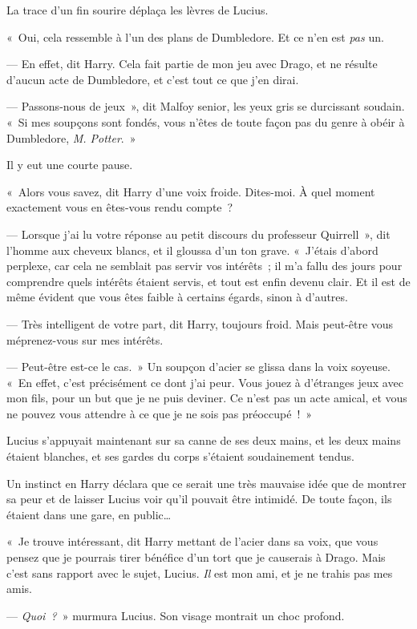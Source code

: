 La trace d'un fin sourire déplaça les lèvres de Lucius.

«~Oui, cela ressemble à l'un des plans de Dumbledore.
Et ce n'en est \emph{pas} un.

--- En effet, dit Harry.
Cela fait partie de mon jeu avec Drago, et ne résulte d'aucun acte de Dumbledore, et c'est tout ce que j'en dirai.

--- Passons-nous de jeux~», dit Malfoy senior, les yeux gris se durcissant soudain.
«~Si mes soupçons sont fondés, vous n'êtes de toute façon pas du genre à obéir à Dumbledore, \emph{M. Potter}.~»

Il y eut une courte pause.

«~Alors vous savez, dit Harry d'une voix froide.
Dites-moi.
À quel moment exactement vous en êtes-vous rendu compte~?

--- Lorsque j'ai lu votre réponse au petit discours du professeur Quirrell~», dit l'homme aux cheveux blancs, et il gloussa d'un ton grave.
«~J'étais d'abord perplexe, car cela ne semblait pas servir vos intérêts~; il m'a fallu des jours pour comprendre quels intérêts étaient servis, et tout est enfin devenu clair.
Et il est de même évident que vous êtes faible à certains égards, sinon à d'autres.

--- Très intelligent de votre part, dit Harry, toujours froid.
Mais peut-être vous méprenez-vous sur mes intérêts.

--- Peut-être est-ce le cas.~»
Un soupçon d'acier se glissa dans la voix soyeuse.
«~En effet, c'est précisément ce dont j'ai peur.
Vous jouez à d'étranges jeux avec mon fils, pour un but que je ne puis deviner.
Ce n'est pas un acte amical, et vous ne pouvez vous attendre à ce que je ne sois pas préoccupé~!~»

Lucius s'appuyait maintenant sur sa canne de ses deux mains, et les deux mains étaient blanches, et ses gardes du corps s'étaient soudainement tendus.

Un instinct en Harry déclara que ce serait une très mauvaise idée que de montrer sa peur et de laisser Lucius voir qu'il pouvait être intimidé.
De toute façon, ils étaient dans une gare, en public…

«~Je trouve intéressant, dit Harry mettant de l'acier dans sa voix, que vous pensez que je pourrais tirer bénéfice d'un tort que je causerais à Drago.
Mais c'est sans rapport avec le sujet, Lucius.
\emph{Il} est mon ami, et je ne trahis pas mes amis.

--- \emph{Quoi~?}~» murmura Lucius.
Son visage montrait un choc profond.

